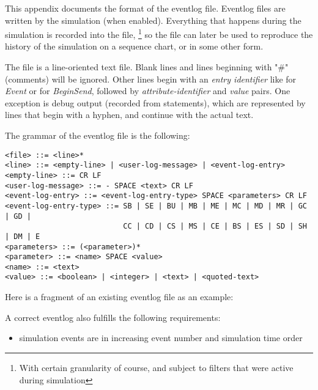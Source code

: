 \label{cha:eventlog-file-format}

This appendix documents the format of the eventlog file. Eventlog
files are written by the simulation (when enabled). Everything
that happens during the simulation is recorded into the file,
  \footnote{With certain granularity of course, and subject to
  filters that were active during simulation}
so the file can later be used to reproduce the history of the
simulation on a sequence chart, or in some other form.

The file is a line-oriented text file. Blank lines and lines beginning
with "\#" (comments) will be ignored. Other lines begin with an
\textit{entry identifier} like  for \textit{Event} or
 for \textit{BeginSend}, followed by \textit{attribute-identifier}
and \textit{value} pairs. One exception is debug output
(recorded from  statements), which are represented
by lines that begin with a hyphen, and continue with the actual text.

The grammar of the eventlog file is the following:

\begin{verbatim}
<file> ::= <line>*
<line> ::= <empty-line> | <user-log-message> | <event-log-entry>
<empty-line> ::= CR LF
<user-log-message> ::= - SPACE <text> CR LF
<event-log-entry> ::= <event-log-entry-type> SPACE <parameters> CR LF
<event-log-entry-type> ::= SB | SE | BU | MB | ME | MC | MD | MR | GC | GD |
                           CC | CD | CS | MS | CE | BS | ES | SD | SH | DM | E
<parameters> ::= (<parameter>)*
<parameter> ::= <name> SPACE <value>
<name> ::= <text>
<value> ::= <boolean> | <integer> | <text> | <quoted-text>
\end{verbatim}

Here is a fragment of an existing eventlog file as an example:


A correct eventlog also fulfills the following requirements:
\begin{itemize}
   \item simulation events are in increasing event number and simulation time order
\end{itemize}

